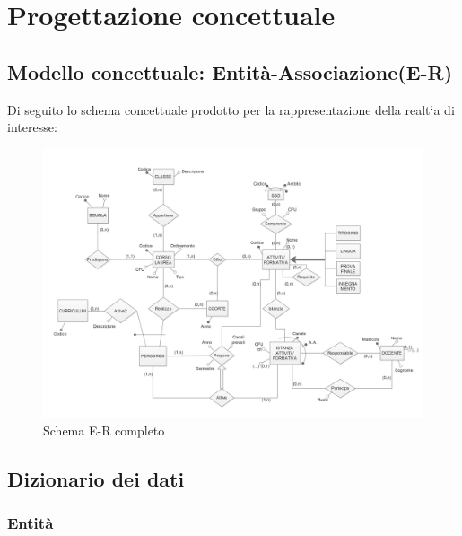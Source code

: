 \documentclass[a4paper,12pt,italian,towside]{article}
\begin{document}
\newpage
\clearpage
\section{Progettazione concettuale}

\subsection{Modello concettuale: Entit\`a-Associazione(E-R)}
Di seguito lo schema concettuale prodotto per la rappresentazione della realt`a di interesse:

\begin{figure}[!h] %
	\caption{Schema E-R completo}
	\begin{center}
		\includegraphics[scale=0.5,angle=90]{../Schemas/ER_diagram.jpg}
	\end{center}
\end{figure}

\subsection{Dizionario dei dati}

\subsubsection{Entit\`a}
\end{document}
